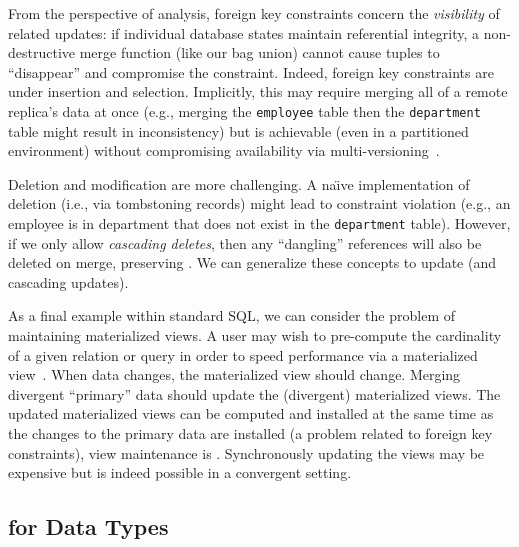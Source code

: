 From the perspective of \iconfluence analysis, foreign key constraints
concern the \textit{visibility} of related updates: if individual
database states maintain referential integrity, a non-destructive
merge function (like our bag union) cannot cause tuples to
``disappear'' and compromise the constraint. Indeed, foreign key
constraints are \iconfluent under insertion and selection. Implicitly,
this may require merging all of a remote replica's data at once (e.g.,
merging the \texttt{employee} table then the \texttt{department} table
might result in inconsistency) but is achievable (even in a
partitioned environment) without compromising availability via
multi-versioning~\cite{ramp-txns,hat-vldb}.

Deletion and modification are more challenging. A na\"{\i}ve
implementation of deletion (i.e., via tombstoning records) might lead
to constraint violation (e.g., an employee is in department that does
not exist in the \texttt{department} table). However, if we only allow
\textit{cascading deletes}, then any ``dangling'' references will also
be deleted on merge, preserving \iconfluence. We can generalize these
concepts to update (and cascading updates).

 As a final example within standard SQL,
we can consider the problem of maintaining materialized views. A user
may wish to pre-compute the cardinality of a given relation or query
in order to speed performance via a materialized
view~\cite{gray-book}. When data changes, the materialized view should
change. Merging divergent ``primary'' data should update the
(divergent) materialized views. The updated materialized views can be
computed and installed at the same time as the changes to the primary
data are installed (a problem related to foreign key constraints),
view maintenance is \iconfluent. Synchronously updating the views may
be expensive but is indeed possible in a convergent setting.

\subsection{\iconfluence for Data Types}

